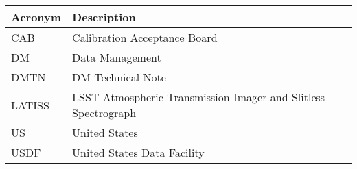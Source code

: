\addtocounter{table}{-1}
\begin{longtable}{p{}p{}}\hline
\textbf{Acronym} & \textbf{Description}  \\\hline

CAB & Calibration Acceptance Board \\\hline
DM & Data Management \\\hline
DMTN & DM Technical Note \\\hline
LATISS & LSST Atmospheric Transmission Imager and Slitless Spectrograph \\\hline
US & United States \\\hline
USDF & United States Data Facility \\\hline
\end{longtable}
